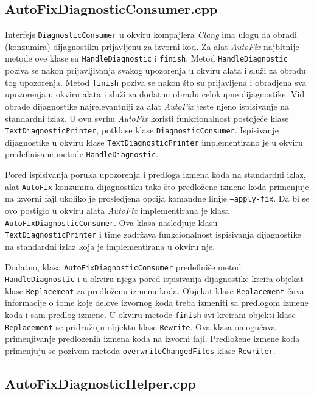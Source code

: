 \documentclass[12pt,oneside]{memoir}
\begin{document}
\subsection{AutoFixDiagnosticConsumer.cpp}
Interfejs \texttt{DiagnosticConsumer} u okviru kompajlera \textit{Clang} ima ulogu da obradi (konzumira) dijagnostiku prijavljenu
za izvorni kod. Za alat \textit{AutoFix} najbitnije metode ove klase su \texttt{HandleDiagnostic} i \texttt{finish}. Metod \texttt{HandleDiagnostic} poziva se nakon prijavljivanja svakog upozorenja u okviru alata i slu\v{z}i za obradu tog upozorenja. Metod \texttt{finish} poziva se nakon \v{s}to su prijavljena i obradjena sva upozorenja u okviru alata i slu\v{z}i za dodatnu obradu celokupne dijagnostike. Vid obrade dijagnostike najrelevantniji za alat \textit{AutoFix} jeste njeno ispisivanje na standardni izlaz. U ovu 
svrhu \textit{AutoFix} koristi funkcionalnost postoje\'{c}e klase \texttt{TextDiagnosticPrinter}, potklase klase \texttt{DiagnosticConsumer}. Ispisivanje dijagnostike u okviru klase \texttt{TextDiagnosticPrinter} implementirano je u okviru predefinisane metode \texttt{HandleDiagnostic}. \par
Pored ispisivanja poruka upozorenja i predloga izmena koda na standardni izlaz, alat \texttt{AutoFix} konzumira dijagnostiku tako \v{s}to predlo\v{z}ene izmene koda primenjuje na izvorni fajl ukoliko je prosledjena opcija komandne linije \texttt{--apply-fix}.
Da bi se ovo postiglo u okviru alata \textit{AutoFix} implementirana je klasa \texttt{AutoFix\-DiagnosticConsumer}. Ova klasa nasledjuje
klasu \texttt{TextDiagnosticPrinter} i time zadr\v{z}ava funkcionalnost ispisivanja dijagnostike na standardni izlaz koja je implementirana u okviru nje. \par Dodatno, klasa \texttt{AutoFixDiagnosticConsumer} predefini\v{s}e metod \texttt{HandleDiag\-nostic} i u okviru njega pored ispisivanja dijagnostike kreira objekat klase \texttt{Replace\-ment} za predlo\v{z}enu izmenu koda. Objekat klase \texttt{Replacement} \v{c}uva informacije o tome koje delove izvornog koda treba izmeniti sa predlogom izmene koda i sam predlog izmene.
U okviru metode \texttt{finish} svi kreirani objekti klase \texttt{Replacement} se pridru\v{z}uju objektu klase \texttt{Rewrite}.
Ova klasa omogu\'{c}ava primenjivanje predlozenih izmena koda na izvorni fajl. Predlo\v{z}ene izmene koda primenjuju se pozivom metoda \texttt{overwriteChangedFiles} klase \texttt{Rewriter}.

\subsection{AutoFixDiagnosticHelper.cpp}
\end{document}
